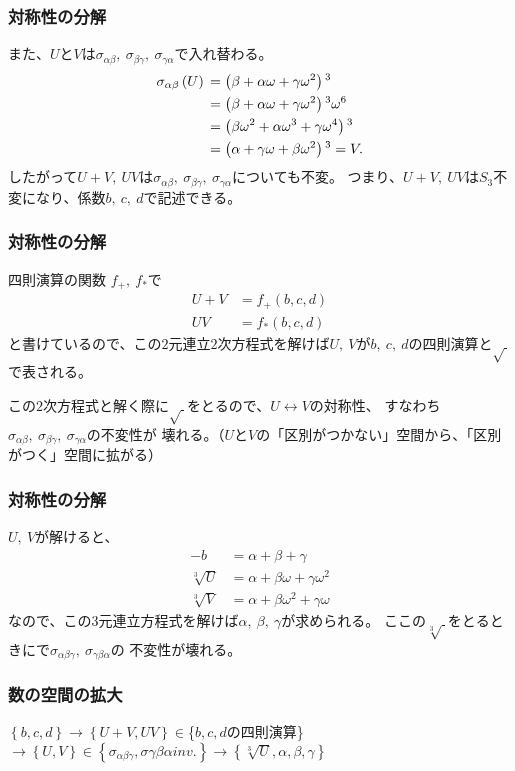 \documentclass[12pt, t]{beamer}
\newcommand{\lr}[1]{\left({}#1\right){}}
\newcommand{\clr}[1]{\left\{{}#1\right\}{}}
\begin{document}
\begin{frame}
\frametitle{対称性の分解}
また、$U$と$V$は$\sigma_{\alpha \beta},\ \sigma_{\beta \gamma},\ \sigma_{\gamma \alpha}$で入れ替わる。
\begin{align}
  \sigma_{\alpha \beta}\lr{U} &= \lr{\beta + \alpha \omega + \gamma \omega^2}^3 \notag \\
                              &= \lr{\beta + \alpha \omega + \gamma \omega^2}^3 \omega^6 \notag \\
                              &= \lr{\beta \omega^2+ \alpha \omega^3 + \gamma \omega^4}^3 \notag \\
                              &= \lr{\alpha + \gamma \omega + \beta \omega^2}^3 = V.
\end{align}
したがって$U + V,\ UV$は$\sigma_{\alpha \beta},\ \sigma_{\beta \gamma},\ \sigma_{\gamma \alpha}$についても不変。
つまり、$U + V,\ UV$は$S_3$不変になり、係数$b,\ c,\ d$で記述できる。
\end{frame}


\begin{frame}
\frametitle{対称性の分解}
四則演算の関数 $f_+,\ f_\ast$で
\begin{align}
  U + V &= f_+(b, c, d) \\
  U V &= f_\ast(b, c, d)
\end{align}
と書けているので、この$2$元連立$2$次方程式を解けば$U,\ V$が$b,\ c,\ d$の四則演算と$\sqrt{\ }$で表される。

この$2$次方程式と解く際に$\sqrt{\ }$をとるので、$U \leftrightarrow V$の対称性、
すなわち$\sigma_{\alpha \beta},\ \sigma_{\beta \gamma},\ \sigma_{\gamma \alpha}$の不変性が
壊れる。（$U$と$V$の「区別がつかない」空間から、「区別がつく」空間に拡がる）
\end{frame}

\begin{frame}
\frametitle{対称性の分解}
$U,\ V$が解けると、
\begin{align}
  -b &= \alpha + \beta + \gamma \\
  \sqrt[3]{U} &= \alpha + \beta \omega + \gamma \omega^2 \\
  \sqrt[3]{V} &= \alpha + \beta \omega^2 + \gamma \omega
\end{align}
なので、この$3$元連立方程式を解けば$\alpha,\ \beta,\ \gamma$が求められる。
ここの$\sqrt[3]{\ }$をとるときにで$\sigma_{\alpha \beta \gamma},\ \sigma_{\gamma \beta \alpha}$の
不変性が壊れる。
\end{frame}

\begin{frame}
\frametitle{数の空間の拡大}
$\clr{b,c,d} \rightarrow \clr{U+V, UV} \in $\{$b,c,d$の四則演算\}$ \rightarrow \clr{U, V} \in \clr{\sigma_{\alpha \beta \gamma}, \sigma{\gamma \beta \alpha} inv.} \rightarrow \clr{\sqrt[3]{U}, \alpha, \beta, \gamma}$
\end{frame}
\end{document}
